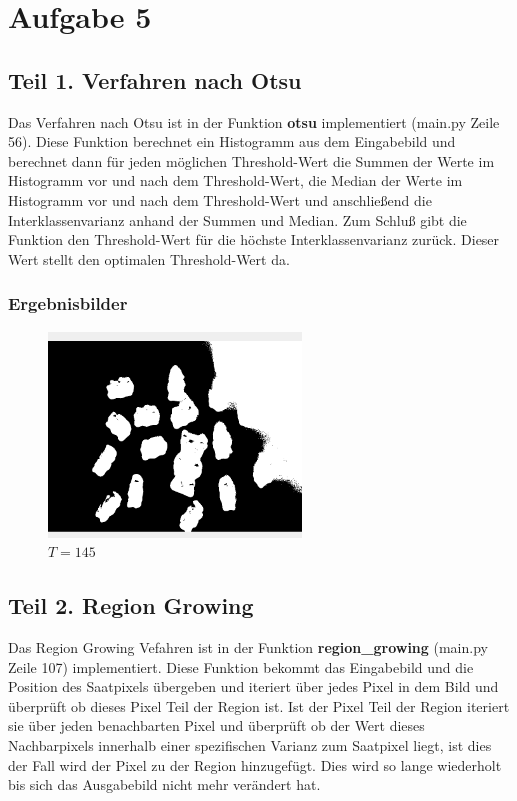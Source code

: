 \documentclass[12pt]{article}
\begin{document}

\section*{Aufgabe 5}
\subsection*{Teil 1. Verfahren nach Otsu}
Das Verfahren nach Otsu ist in der Funktion \textbf{otsu} implementiert (main.py Zeile 56). Diese Funktion berechnet ein Histogramm aus dem Eingabebild und berechnet dann für jeden möglichen Threshold-Wert die Summen der Werte im Histogramm vor und nach dem Threshold-Wert, die Median der Werte im Histogramm vor und nach dem Threshold-Wert und anschließend die Interklassenvarianz anhand der Summen und Median.
Zum Schluß gibt die Funktion den Threshold-Wert für die höchste Interklassenvarianz zurück. Dieser Wert stellt den optimalen Threshold-Wert da.

\subsubsection*{Ergebnisbilder}
\begin{figure}[H]
  \centering
  \includegraphics[width=0.6\textwidth, keepaspectratio]{otsu.png}\\
  $T = 145$
\end{figure}

\newpage

\subsection*{Teil 2. Region Growing}
Das Region Growing Vefahren ist in der Funktion \textbf{region\_growing} (main.py Zeile 107) implementiert.
Diese Funktion bekommt das Eingabebild und die Position des Saatpixels übergeben und iteriert über jedes Pixel in dem Bild und überprüft ob dieses Pixel Teil der Region ist. Ist der Pixel Teil der Region iteriert sie über jeden benachbarten Pixel und überprüft ob der Wert dieses Nachbarpixels innerhalb einer spezifischen Varianz zum Saatpixel liegt, ist dies der Fall wird der Pixel zu der Region hinzugefügt. Dies wird so lange wiederholt bis sich das Ausgabebild nicht mehr verändert hat.
\end{document}
